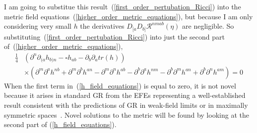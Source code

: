 \documentclass[aps,prd,preprint]{revtex4-1}
\begin{document}
I am going to substitue this result~(\ref{first_order_pertubation_Ricci}) into the metric field equations~(\ref{higher_order_metric_equations}), but because I am only considering very small $h$ the derivatives $D_{[a} D_{b]} \mathcal{R}^{nmab}(\eta)$ are negligible. So substituting~(\ref{first_order_pertubation_Ricci}) into just the second part of~(\ref{higher_order_metric_equations}),
\begin{equation}
\begin{aligned}\label{h_field_equations}
    \frac{1}{4} &\left( \partial^n\partial_{(a}h_{b)n} - \square h_{ab} - \partial_b\partial_{a}tr(h) \right) \\
    &\times \left( \partial^m\partial^{a}h^{nb} + \partial^m\partial^{b}h^{an} - \partial^m\partial^{n}h^{ab} - \partial^b\partial^{a}h^{nm} - \partial^b\partial^{m}h^{an} + \partial^b\partial^{n}h^{am} \right) = 0
\end{aligned}
\end{equation}
When the first term in~(\ref{h_field_equations}) is equal to zero, it is not novel because it arises in standard GR from the EFEs representing a well-established result consistent with the predictions of GR in weak-field limits or in maximally symmetric spaces~\cite{caprini_2018}. Novel solutions to the metric will be found by looking at the second part of (\ref{h_field_equations}).
\\
\end{document}

